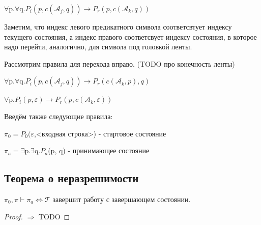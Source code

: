 \documentclass{article}
\begin{document}
\begin{center}
    $\forall$p.$\forall$q.$P_i(p, c(\mathcal{A}_j, q))\to P_r(p, c(\mathcal{A}_k, q))$
\end{center}

Заметим, что индекс левого предикатного символа соответсвтует индексу текущего состояния, а индекс правого соответсвует индексу состояния, в которое надо перейти, аналогично, для символа под головкой ленты.

Рассмотрим правила для перехода вправо. (TODO про конечность ленты) 
\begin{center}
    $\forall$p.$\forall$q.$P_i(p, c(\mathcal{A}_j, q))\to P_r(c(\mathcal{A}_k, p), q)$
    
    $\forall$p.$P_i(p, \varepsilon)\to P_r(p, c(\mathcal{A}_k, \varepsilon))$
\end{center}

Введём также следующие правила:
\begin{center}
    $\pi_0=P_0(\varepsilon$,<входная строка>) - стартовое состояние
    
    $\pi_a=\exists$p.$\exists$q.$P_a$(p, q) - принимающее состояние
\end{center}

\subsection{Теорема о неразрешимости}

\begin{theorem} $\pi_0, \pi \vdash \pi_a \Longleftrightarrow \mathcal{T}$ завершит работу с завершающем состоянии.
\end{theorem} 
\begin{proof}
    $\Longrightarrow$ TODO
\end{proof}
\end{document}
